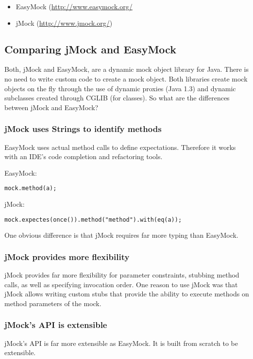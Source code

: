 \begin{itemize}
 \item EasyMock (\href{http://www.easymock.org/}{http://www.easymock.org/}
 \item jMock (\href{http://www.jmock.org/}{http://www.jmock.org/})
\end{itemize}


\subsection{Comparing jMock and EasyMock}
Both, jMock and EasyMock, are a dynamic mock object library for Java. There
is no need to write custom code to create a mock object. Both libraries
create mock objects on the fly through the use of dynamic proxies (Java 1.3)
and dynamic subclasses created through CGLIB (for classes). So what
are the differences between jMock and EasyMock?

\subsubsection{jMock uses Strings to identify methods}
EasyMock uses actual method calls to define expectations. Therefore it works
with an IDE's code completion and refactoring tools.

EasyMock:
\small{\begin{verbatim}
mock.method(a);
\end{verbatim}}

jMock:
\small{\begin{verbatim}
mock.expectes(once()).method("method").with(eq(a));
\end{verbatim}}

One obvious difference is that jMock requires far more typing than
EasyMock.

\subsubsection{jMock provides more flexibility}
jMock provides far more flexibility for parameter constraints, stubbing
method calls, as well as specifying invocation order. One reason to use
jMock was that jMock allows writing custom stubs that provide the ability
to execute methods on method parameters of the mock.

\subsubsection{jMock's API is extensible}
jMock's API is far more extensible as EasyMock. It is built from scratch to
be extensible.

